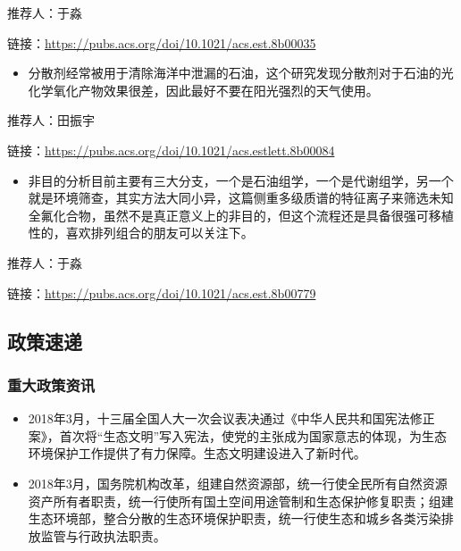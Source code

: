 \documentclass[]{book}
\providecommand{\tightlist}{%
  \setlength{\itemsep}{0pt}\setlength{\parskip}{0pt}}
\begin{document}
推荐人：于淼

链接：\url{https://pubs.acs.org/doi/10.1021/acs.est.8b00035}

\begin{itemize}
\tightlist
\item
  分散剂经常被用于清除海洋中泄漏的石油，这个研究发现分散剂对于石油的光化学氧化产物效果很差，因此最好不要在阳光强烈的天气使用。
\end{itemize}

推荐人：田振宇

链接：\url{https://pubs.acs.org/doi/10.1021/acs.estlett.8b00084}

\begin{itemize}
\tightlist
\item
  非目的分析目前主要有三大分支，一个是石油组学，一个是代谢组学，另一个就是环境筛查，其实方法大同小异，这篇侧重多级质谱的特征离子来筛选未知全氟化合物，虽然不是真正意义上的非目的，但这个流程还是具备很强可移植性的，喜欢排列组合的朋友可以关注下。
\end{itemize}

推荐人：于淼

链接：\url{https://pubs.acs.org/doi/10.1021/acs.est.8b00779}

\hypertarget{ux653fux7b56ux901fux9012}{%
\subsection*{政策速递}\label{ux653fux7b56ux901fux9012}}

\hypertarget{ux91cdux5927ux653fux7b56ux8d44ux8baf}{%
\subsubsection*{重大政策资讯}\label{ux91cdux5927ux653fux7b56ux8d44ux8baf}}

\begin{itemize}
\item
  2018年3月，十三届全国人大一次会议表决通过《中华人民共和国宪法修正案》，首次将``生态文明''写入宪法，使党的主张成为国家意志的体现，为生态环境保护工作提供了有力保障。生态文明建设进入了新时代。
\item
  2018年3月，国务院机构改革，组建自然资源部，统一行使全民所有自然资源资产所有者职责，统一行使所有国土空间用途管制和生态保护修复职责；组建生态环境部，整合分散的生态环境保护职责，统一行使生态和城乡各类污染排放监管与行政执法职责。
\end{itemize}
\end{document}
